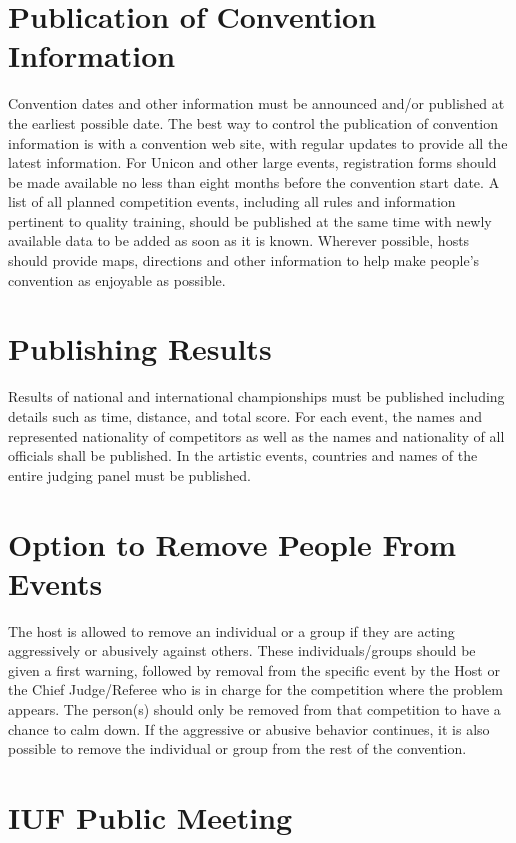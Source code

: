 \section{Publication of Convention Information}

Convention dates and other information must be announced and/or published at the earliest possible date.
The best way to control the publication of convention information is with a convention web site, with regular updates to provide all the latest information.
For Unicon and other large events, registration forms should be made available no less than eight months before the convention start date.
A list of all planned competition events, including all rules and information pertinent to quality training, should be published at the same time with newly available data to be added as soon as it is known.
Wherever possible, hosts should provide maps, directions and other information to help make people's convention as enjoyable as possible.

\section{Publishing Results \label{sec:publishing_results}}
Results of national and international championships must be published including details such as time, distance, and total score.
For each event, the names and represented nationality of competitors as well as the names and nationality of all officials shall be published.
In the artistic events, countries and names of the entire judging panel must be published. %

\section{Option to Remove People From Events}
The host is allowed to remove an individual or a group if they are acting aggressively or abusively against others.
These individuals/groups should be given a first warning, followed by removal from the specific event by the Host or the Chief Judge/Referee who is in charge for the competition where the problem appears.
The person(s) should only be removed from that competition to have a chance to calm down.
If the aggressive or abusive behavior continues, it is also possible to remove the individual or group from the rest of the convention.

\section{IUF Public Meeting}

